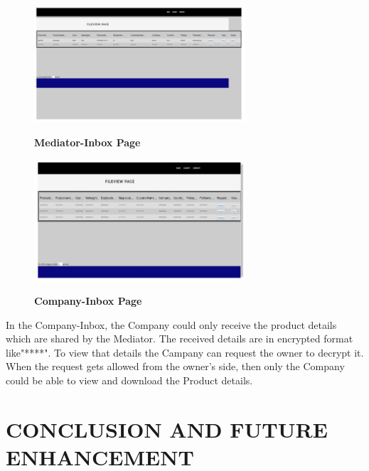 \documentclass[BTech]{srmuthesis}
\begin{document}
\begin{figure}[H]
\centering
\includegraphics[width=0.7\textwidth]{mediatorinboxpage.jpg}
\label{Figure:10} \hspace{10mm}
\caption{\textbf{Mediator-Inbox Page}}
\end{figure}

\begin{figure}[H]
\centering
\includegraphics[width=0.7\textwidth]{companyinbox.jpg}
\label{Figure:10} \hspace{10mm}
\caption{\textbf{Company-Inbox Page}}
\end{figure}
In the Company-Inbox, the Company could only receive the product details which are shared by the Mediator. The received details are in encrypted format like"****". To view that details the Campany can request the owner to decrypt it. When the request gets allowed from the owner's side, then only the Company could be able to view and download the Product details.

\chapter{CONCLUSION AND FUTURE ENHANCEMENT}
\end{document}
